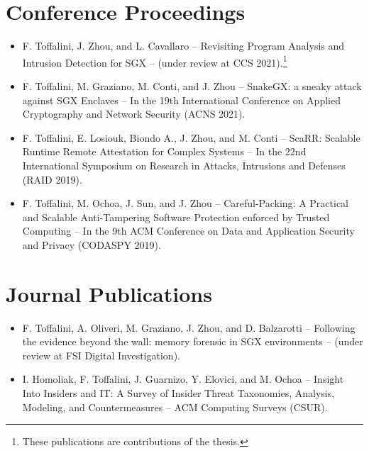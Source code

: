 \documentclass[
11pt, %
oneside, %
english, %
singlespacing, %
headsepline, %
]{MastersDoctoralThesis} %
\makeatletter
\newcommand\footnoteref[1]{\protected@xdef\@thefnmark{\ref{#1}}\@footnotemark}
\makeatother
\begin{document}
\begin{publications}
\addchaptertocentry{\publicationsname} %

\section*{Conference Proceedings}
\begin{itemize}
	
	\item F. Toffalini, J. Zhou, and L. Cavallaro -- Revisiting Program 
	Analysis and Intrusion Detection for SGX -- (under review at CCS 
	2021).\footnote[$\dagger$]{\label{inthesis}These publications are 
	contributions of the thesis.}
	
	\item F. Toffalini, M. Graziano, M. Conti, and J. Zhou -- SnakeGX: a sneaky 
	attack against SGX Enclaves -- In the 19th International Conference on 
	Applied Cryptography and Network Security (ACNS 
	2021). \footnoteref{inthesis}
	
	\item F. Toffalini, E. Losiouk, Biondo A., J. Zhou, and M. Conti -- ScaRR: 
	Scalable Runtime Remote Attestation for Complex Systems -- In the 22nd 
	International Symposium on Research in Attacks, Intrusions and Defenses 
	(RAID 2019). \footnoteref{inthesis}
	
	\item F. Toffalini, M. Ochoa, J. Sun, and J. Zhou -- Careful-Packing: A 
	Practical and Scalable Anti-Tampering Software Protection enforced by 
	Trusted Computing -- In the 9th ACM Conference on Data and Application 
	Security and Privacy (CODASPY 2019). \footnoteref{inthesis}
	
\end{itemize}

\section*{Journal Publications}
\begin{itemize}
	\item F. Toffalini, A. Oliveri, M. Graziano, J. Zhou, and D. Balzarotti -- 
	Following the evidence beyond the wall:	memory forensic in SGX 
	environments -- (under review at FSI Digital 
	Investigation). \footnoteref{inthesis}
	
	\item I. Homoliak, F. Toffalini, J. Guarnizo, Y. Elovici, and M. 
	Ochoa -- Insight Into Insiders and IT: A Survey of Insider Threat 
	Taxonomies, Analysis, Modeling, and Countermeasures -- ACM Computing 
	Surveys (CSUR).
	

\end{itemize}
\end{publications}
\end{document}
